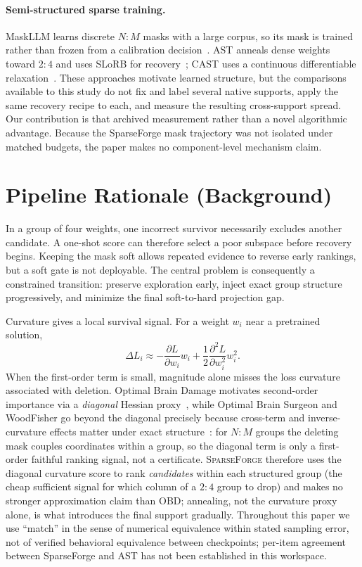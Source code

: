 \documentclass{article}
\newcommand{\method}{\textsc{SparseForge}}
\begin{document}
\paragraph{Semi-structured sparse training.}
MaskLLM learns discrete $N{:}M$ masks with a large corpus, so its mask is trained rather than frozen
from a calibration decision~\citep{fang2024maskllm}. AST anneals dense weights toward $2{:}4$ and
uses SLoRB for recovery~\citep{huang2025ast}; CAST uses a continuous differentiable
relaxation~\citep{huang2025cast}. These approaches motivate learned structure, but the comparisons
available to this study do not fix and label several native supports, apply the same recovery recipe
to each, and measure the resulting cross-support spread. Our contribution is that archived
measurement rather than a novel algorithmic advantage. Because the SparseForge mask trajectory was
not isolated under matched budgets, the paper makes no component-level mechanism claim.

\section{Pipeline Rationale (Background)}
In a group of four weights, one incorrect survivor necessarily excludes another candidate. A one-shot score can therefore select a poor subspace before recovery begins. Keeping the mask soft allows repeated evidence to reverse early rankings, but a soft gate is not deployable. The central problem is consequently a constrained transition: preserve exploration early, inject exact group structure progressively, and minimize the final soft-to-hard projection gap.

Curvature gives a local survival signal. For a weight $w_i$ near a pretrained solution,
\begin{equation}
\Delta L_i \approx -\frac{\partial L}{\partial w_i}w_i + \frac{1}{2}\frac{\partial^2 L}{\partial w_i^2}w_i^2.
\end{equation}
When the first-order term is small, magnitude alone misses the loss curvature associated with deletion. Optimal Brain Damage motivates second-order importance via a \emph{diagonal} Hessian proxy~\citep{lecun1990obd}, while Optimal Brain Surgeon and WoodFisher go beyond the diagonal precisely because cross-term and inverse-curvature effects matter under exact structure~\citep{hassibi1993obs,singh2020woodfisher}: for $N{:}M$ groups the deleting mask couples coordinates within a group, so the diagonal term is only a first-order faithful ranking signal, not a certificate. \method{} therefore uses the diagonal curvature score to rank \emph{candidates} within each structured group (the cheap sufficient signal for which column of a $2{:}4$ group to drop) and makes no stronger approximation claim than OBD; annealing, not the curvature proxy alone, is what introduces the final support gradually. Throughout this paper we use ``match'' in the sense of numerical equivalence within stated sampling error, not of verified behavioral equivalence between checkpoints; per-item agreement between SparseForge and AST has not been established in this workspace.
\end{document}
